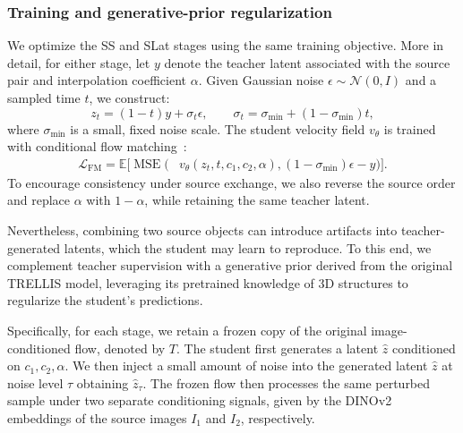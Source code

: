 \subsubsection{Training and generative-prior regularization}
\label{sec:teacher_supervision}
\label{sec:generative_prior}

We optimize the SS and SLat stages using the same training
objective. More in detail, for either stage, let $y$ denote the teacher latent associated
with the source pair and interpolation coefficient $\alpha$.
Given Gaussian noise $\epsilon\sim\mathcal N(0,I)$ and a
sampled time $t$, we construct:
\begin{equation}
 z_t=(1-t)y+\sigma_t\epsilon,
 \qquad
 \sigma_t=\sigma_{\min}+(1-\sigma_{\min})t,
\end{equation}
where $\sigma_{\min}$ is a small, fixed noise scale.
The student velocity field $v_\theta$ is trained with
conditional flow matching~\cite{lipman2022flowmatching}:
\begin{equation}
 \begin{aligned}
 \mathcal L_{\mathrm{FM}}
 =\mathbb E\big[
 \operatorname{MSE}\big(
 &v_\theta(z_t,t,c_1,c_2,\alpha),
 (1-\sigma_{\min})\epsilon-y
 \big)\big].
 \end{aligned}
 \label{eq:flow_matching}
\end{equation}
To encourage consistency under source exchange, we also reverse the source order and replace $\alpha$ with $1-\alpha$, while retaining the same teacher latent.

Nevertheless, combining two source objects can introduce artifacts into teacher-generated latents, which the student may learn to reproduce. To this end, we complement teacher supervision with a generative prior derived from the original TRELLIS model, leveraging its pretrained knowledge of 3D structures to regularize the student's predictions.

Specifically, for each stage, we retain a frozen copy of the original image-conditioned flow, denoted by $T$. The student first
generates a latent $\hat z$ conditioned on $c_1,c_2,\alpha$. We then inject a small amount of noise into the generated latent $\hat z$ at noise level $\tau$ obtaining $\hat z_\tau$. The frozen flow then processes the same perturbed sample under two separate conditioning signals, given by the DINOv2 embeddings of the source images $I_1$ and $I_2$, respectively.


